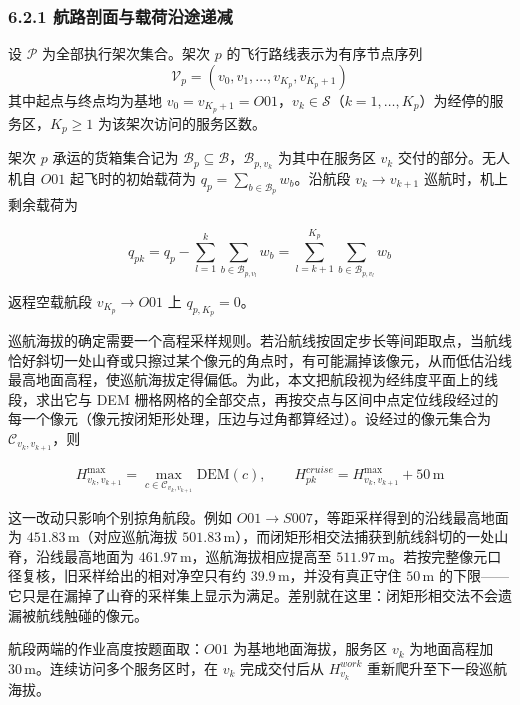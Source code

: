 \documentclass[withoutpreface,bwprint]{format}
\begin{document}
\subsubsection{6.2.1 航路剖面与载荷沿途递减}
设 $\mathcal{P}$ 为全部执行架次集合。架次 $p$ 的飞行路线表示为有序节点序列
\begin{equation}
\mathcal{V}_p = (v_0, v_1, \dots, v_{K_p}, v_{K_p+1})
\end{equation}
其中起点与终点均为基地 $v_0 = v_{K_p+1} = O01$，$v_k \in \mathcal{S}$（$k = 1, \dots, K_p$）为经停的服务区，$K_p \ge 1$ 为该架次访问的服务区数。

架次 $p$ 承运的货箱集合记为 $\mathcal{B}_p \subseteq \mathcal{B}$，$\mathcal{B}_{p, v_k}$ 为其中在服务区 $v_k$ 交付的部分。无人机自 $O01$ 起飞时的初始载荷为 $q_p = \sum_{b \in \mathcal{B}_p} w_b$。沿航段 $v_k \to v_{k+1}$ 巡航时，机上剩余载荷为

\begin{equation}
q_{pk} = q_p - \sum_{l=1}^k \sum_{b \in \mathcal{B}_{p, v_l}} w_b = \sum_{l=k+1}^{K_p} \sum_{b \in \mathcal{B}_{p, v_l}} w_b
\end{equation}

返程空载航段 $v_{K_p} \to O01$ 上 $q_{p, K_p} = 0$。

巡航海拔的确定需要一个高程采样规则。若沿航线按固定步长等间距取点，当航线恰好斜切一处山脊或只擦过某个像元的角点时，有可能漏掉该像元，从而低估沿线最高地面高程，使巡航海拔定得偏低。为此，本文把航段视为经纬度平面上的线段，求出它与 DEM 栅格网格的全部交点，再按交点与区间中点定位线段经过的每一个像元（像元按闭矩形处理，压边与过角都算经过）。设经过的像元集合为 $\mathcal{C}_{v_k, v_{k+1}}$，则

\begin{equation}
H_{v_k, v_{k+1}}^{\max} = \max_{c \in \mathcal{C}_{v_k, v_{k+1}}} \text{DEM}(c), \qquad H_{pk}^{cruise} = H_{v_k, v_{k+1}}^{\max} + 50\,\text{m}
\end{equation}

这一改动只影响个别掠角航段。例如 $O01 \to S007$，等距采样得到的沿线最高地面为 $451.83\,\text{m}$（对应巡航海拔 $501.83\,\text{m}$），而闭矩形相交法捕获到航线斜切的一处山脊，沿线最高地面为 $461.97\,\text{m}$，巡航海拔相应提高至 $511.97\,\text{m}$。若按完整像元口径复核，旧采样给出的相对净空只有约 $39.9\,\text{m}$，并没有真正守住 $50\,\text{m}$ 的下限——它只是在漏掉了山脊的采样集上显示为满足。差别就在这里：闭矩形相交法不会遗漏被航线触碰的像元。

航段两端的作业高度按题面取：$O01$ 为基地地面海拔，服务区 $v_k$ 为地面高程加 $30\,\text{m}$。连续访问多个服务区时，在 $v_k$ 完成交付后从 $H_{v_k}^{work}$ 重新爬升至下一段巡航海拔。
\end{document}
